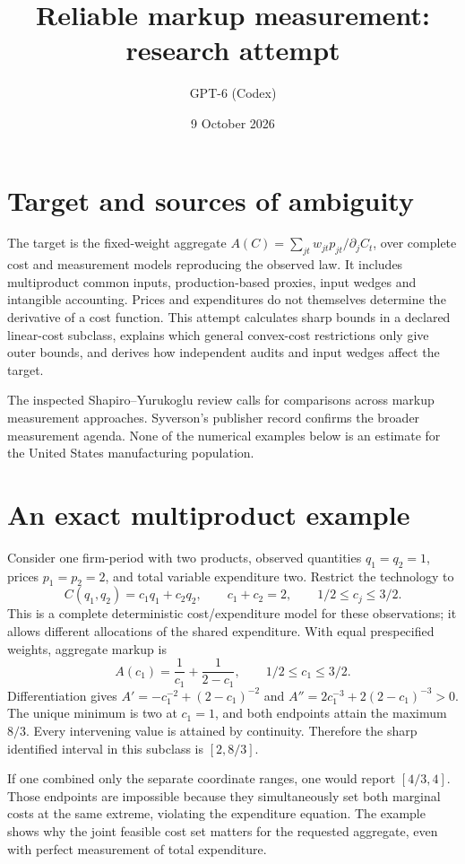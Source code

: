 \documentclass[11pt]{article}
\title{Reliable markup measurement: research attempt}
\author{GPT-6 (Codex)}
\date{9 October 2026}
\begin{document}
\maketitle

\section*{Target and sources of ambiguity}
The target is the fixed-weight aggregate $A(C)=\sum_{jt}w_{jt}p_{jt}/\partial_jC_t$, over complete cost and measurement models reproducing the observed law. It includes multiproduct common inputs, production-based proxies, input wedges and intangible accounting. Prices and expenditures do not themselves determine the derivative of a cost function. This attempt calculates sharp bounds in a declared linear-cost subclass, explains which general convex-cost restrictions only give outer bounds, and derives how independent audits and input wedges affect the target.

The inspected Shapiro--Yurukoglu review calls for comparisons across markup measurement approaches. Syverson's publisher record confirms the broader measurement agenda. None of the numerical examples below is an estimate for the United States manufacturing population.

\section*{An exact multiproduct example}
Consider one firm-period with two products, observed quantities $q_1=q_2=1$, prices $p_1=p_2=2$, and total variable expenditure two. Restrict the technology to
\[
 C(q_1,q_2)=c_1q_1+c_2q_2,
 \qquad c_1+c_2=2,\qquad 1/2\leq c_j\leq3/2.
\]
This is a complete deterministic cost/expenditure model for these observations; it allows different allocations of the shared expenditure. With equal prespecified weights, aggregate markup is
\[
 A(c_1)=\frac1{c_1}+\frac1{2-c_1},\qquad 1/2\leq c_1\leq3/2.
\]
Differentiation gives $A'=-c_1^{-2}+(2-c_1)^{-2}$ and $A''=2c_1^{-3}+2(2-c_1)^{-3}>0$. The unique minimum is two at $c_1=1$, and both endpoints attain the maximum $8/3$. Every intervening value is attained by continuity. Therefore the sharp identified interval in this subclass is $[2,8/3]$.

If one combined only the separate coordinate ranges, one would report $[4/3,4]$. Those endpoints are impossible because they simultaneously set both marginal costs at the same extreme, violating the expenditure equation. The example shows why the joint feasible cost set matters for the requested aggregate, even with perfect measurement of total expenditure.
\end{document}
